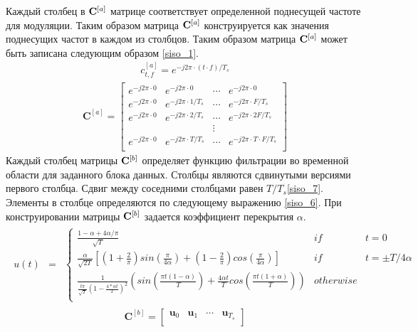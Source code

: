 Каждый столбец в $\mathbf{C}^{[a]}$ матрице соответствует определенной поднесущей частоте для модуляции. Таким образом матрица $\mathbf{C}^{[a]}$ конструируется как значения поднесущих частот в каждом из столбцов. Таким образом матрица $\mathbf{C}^{[a]}$ может быть записана следующим образом \eqref{siso_1}.
 \begin{align}
 c^{[a]}_{t,f}=e^{-j2\pi\cdot(t\cdot f)/T_s} \label{siso_4}
 \end{align}
\begin{align}
\mathbf{C}^{[a]}=\begin{bmatrix}
e^{-j2\pi\cdot 0}& e^{-j2\pi\cdot 0}& \cdots & e^{-j2\pi\cdot 0} \\
e^{-j2\pi\cdot 0}& e^{-j2\pi\cdot 1/T_s}& \cdots &e^{-j2\pi\cdot F/T_s} \\
e^{-j2\pi\cdot 0}& e^{-j2\pi\cdot 2/T_s}& \cdots &e^{-j2\pi\cdot 2F/T_s} \\
&&\vdots \\
e^{-j2\pi\cdot 0}& e^{-j2\pi\cdot T/T_s}& \cdots & e^{-j2\pi\cdot T\cdot F /T_s} \\
\end{bmatrix} \label{siso_5}
\end{align}
Каждый столбец матрицы $\mathbf{C}^{[b]}$ определяет функцию фильтрации во временной области для заданного блока данных. Столбцы являются сдвинутыми версиями первого столбца. Сдвиг между соседними столбцами равен $T/T_s$\eqref{siso_7}. Элементы в столбце определяются по следующему выражению \eqref{siso_6}\cite{Book12}. При конструировании матрицы $\mathbf{C}^{[b]}$ задается коэффициент перекрытия $\alpha$.
\begin{align}
\begin{matrix}
u(t) &=& \left\{ \begin{matrix} 
\frac{1-\alpha +4\alpha/\pi}{\sqrt{T}}& if& t=0\\
\frac{\alpha}{\sqrt{2T}}[(1+\frac{2}{\pi})sin(\frac{\pi}{4\alpha})+(1-\frac{2}{\pi})cos(\frac{\pi}{4\alpha})] & if &t= \pm T/4\alpha\\
\frac{1}{\frac{t\pi}{\sqrt{T}}(1-\frac{4*\alpha t}{T})^2}(sin(\frac{\pi t (1-\alpha)}{T})+\frac{4\alpha t}{T} cos(\frac{\pi t (1+ \alpha)}{T}) ) &otherwise \\
\end{matrix} \right.
\end{matrix}\label{siso_6}
\end{align}
\begin{align}
\mathbf{C}^{[b]}=\begin{bmatrix}
\mathbf{u}_{0}& \mathbf{u}_{1}& \cdots &\mathbf{u}_{T_s}\\
\end{bmatrix} \label{siso_7}
\end{align}
